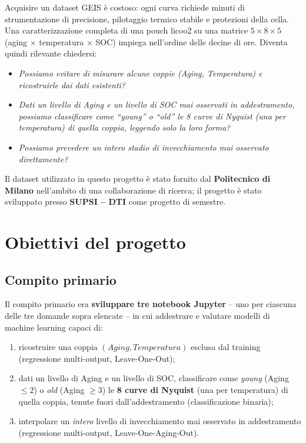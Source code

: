 Acquisire un dataset GEIS è costoso: ogni curva richiede minuti di
strumentazione di precisione, pilotaggio termico stabile e protezioni
della cella. Una caratterizzazione completa di una pouch
\acrshort{licoo2} su una matrice $5 \times 8 \times 5$
(aging $\times$ temperatura $\times$ SOC) impiega nell'ordine delle
decine di ore. Diventa quindi rilevante chiedersi:
\begin{itemize}
  \item \emph{Possiamo evitare di misurare alcune coppie (Aging,
        Temperatura) e ricostruirle dai dati esistenti?}
  \item \emph{Dati un livello di Aging e un livello di SOC mai
        osservati in addestramento, possiamo classificare come
        ``young'' o ``old'' le 8 curve di Nyquist (una per temperatura)
        di quella coppia, leggendo solo la loro forma?}
  \item \emph{Possiamo prevedere un intero stadio di invecchiamento mai
        osservato direttamente?}
\end{itemize}

Il dataset utilizzato in questo progetto è stato fornito dal
\textbf{Politecnico di Milano} nell'ambito di una collaborazione di
ricerca; il progetto è stato sviluppato presso \textbf{SUPSI -- DTI}
come progetto di semestre.

\section{Obiettivi del progetto}

\subsection{Compito primario}

Il compito primario era \textbf{sviluppare tre notebook Jupyter} -- uno
per ciascuna delle tre domande sopra elencate -- in cui addestrare e
valutare modelli di machine learning capaci di:
\begin{enumerate}[leftmargin=*]
  \item ricostruire una coppia $(Aging, Temperatura)$ esclusa dal
        training (regressione multi-output, Leave-One-Out);
  \item dati un livello di Aging e un livello di SOC, classificare
        come \emph{young} (Aging $\leq 2$) o \emph{old}
        (Aging $\geq 3$) le \textbf{8 curve di Nyquist} (una per
        temperatura) di quella coppia, tenute fuori dall'addestramento
        (classificazione binaria);
  \item interpolare un \emph{intero} livello di invecchiamento mai
        osservato in addestramento (regressione multi-output, Leave-One-Aging-Out).
\end{enumerate}

